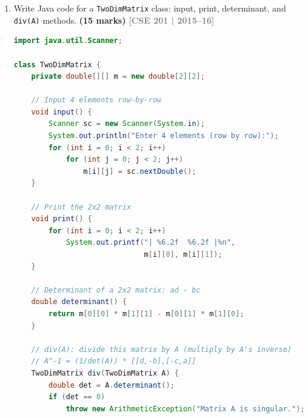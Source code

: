 \documentclass[12pt,a3paper]{article}
\newcommand{\yr}[1]{\hfill\textcolor{gray}{\small\textbf{[#1]}}}
\newcommand{\mk}[1]{\textcolor{orange!70!black}{\small\textbf{(#1 marks)}}}
\begin{document}
\begin{enumerate}
\begin{tcolorbox}[enhanced,breakable,ansbox,
  colback=cC!4,colframe=cC,boxrule=0.8pt,arc=5pt,
  title={\textbf{Answer --- swap() Visible to main()}},
  fonttitle=\bfseries\color{white},colbacktitle=cC]
\begin{lstlisting}[language=java]
public class SwapObjects {
    public static void main(String[] args) {
        NumberWrapper objA = new NumberWrapper(5);
        NumberWrapper objB = new NumberWrapper(10);

        swap(objA, objB);

        System.out.println("objA: " + objA.value); // Outputs 10
        System.out.println("objB: " + objB.value); // Outputs 5
    }

    public static void swap(NumberWrapper a, NumberWrapper b) {
        int temp = a.value;
        a.value = b.value;
        b.value = temp;
    }
}
\end{lstlisting}

\end{tcolorbox}

\item Write Java code for a \texttt{TwoDimMatrix} class: input, print, determinant, and \texttt{div(A)} methods. \mk{15}
\yr{CSE 201 | 2015--16}

\begin{tcolorbox}[enhanced,breakable,ansbox,
  colback=cC!4,colframe=cC,boxrule=0.8pt,arc=5pt,
  title={\textbf{Answer --- TwoDimMatrix Class}},
  fonttitle=\bfseries\color{white},colbacktitle=cC]
\begin{lstlisting}[language=Java]
import java.util.Scanner;

class TwoDimMatrix {
    private double[][] m = new double[2][2];

    // Input 4 elements row-by-row
    void input() {
        Scanner sc = new Scanner(System.in);
        System.out.println("Enter 4 elements (row by row):");
        for (int i = 0; i < 2; i++)
            for (int j = 0; j < 2; j++)
                m[i][j] = sc.nextDouble();
    }

    // Print the 2x2 matrix
    void print() {
        for (int i = 0; i < 2; i++)
            System.out.printf("| %6.2f  %6.2f |%n",
                              m[i][0], m[i][1]);
    }

    // Determinant of a 2x2 matrix: ad - bc
    double determinant() {
        return m[0][0] * m[1][1] - m[0][1] * m[1][0];
    }

    // div(A): divide this matrix by A (multiply by A's inverse)
    // A^-1 = (1/det(A)) * [[d,-b],[-c,a]]
    TwoDimMatrix div(TwoDimMatrix A) {
        double det = A.determinant();
        if (det == 0)
            throw new ArithmeticException("Matrix A is singular.");


\end{lstlisting}
\end{tcolorbox}
\end{enumerate}
\end{document}
